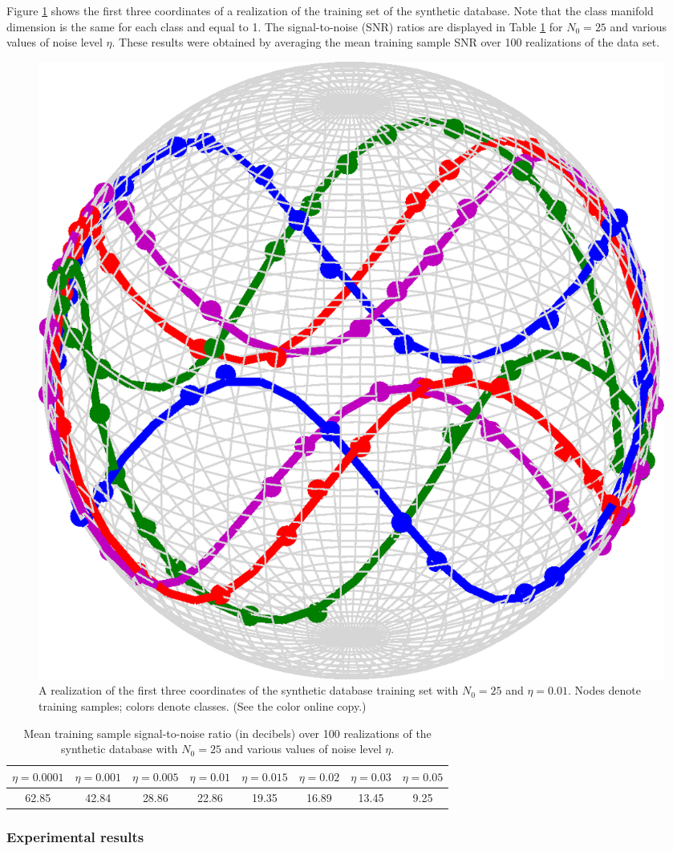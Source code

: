 \documentclass[review]{elsarticle}
\begin{document}
Figure \ref{syn_data_set} shows the first three coordinates of a realization of the training set of the synthetic database. Note that the class manifold dimension is the same for each class and equal to 1. The signal-to-noise (SNR) ratios are displayed in Table \ref{tab:snr} for $N_0 = 25$ and various values of noise level $\eta$. These results were obtained by averaging the mean training sample SNR over 100 realizations of the data set. 
 


\begin{figure}[t]
\begin{center}
\includegraphics[width=0.4\linewidth]{Fig_1}
\caption{A realization of the first three coordinates of the synthetic database training set with $N_0 = 25$ and $\eta = 0.01$. Nodes denote training samples; colors denote classes. (See the color online copy.) }
\label{syn_data_set}
\end{center}
\end{figure}

\begin{table}[!htb] 
\centering
\begin{tabular}{|c|c|c|c|c|c|c|c|}
\hline
$\eta = 0.0001$ & $\eta = 0.001$  & $\eta = 0.005$ & $\eta = 0.01$  & $\eta = 0.015$ & $\eta = 0.02$  & $\eta = 0.03$  & $\eta = 0.05$  \\
\hline
62.85	& 42.84	&	28.86	&	22.86	&	19.35	&	16.89	&	13.45	&	9.25 \\
\hline
\end{tabular}
\caption{Mean training sample signal-to-noise ratio (in decibels) over 100 realizations of the synthetic database with $N_0 = 25$ and various values of noise level $\eta$.\label{tab:snr}}
\end{table}



\subsubsection{Experimental results}
\end{document}
